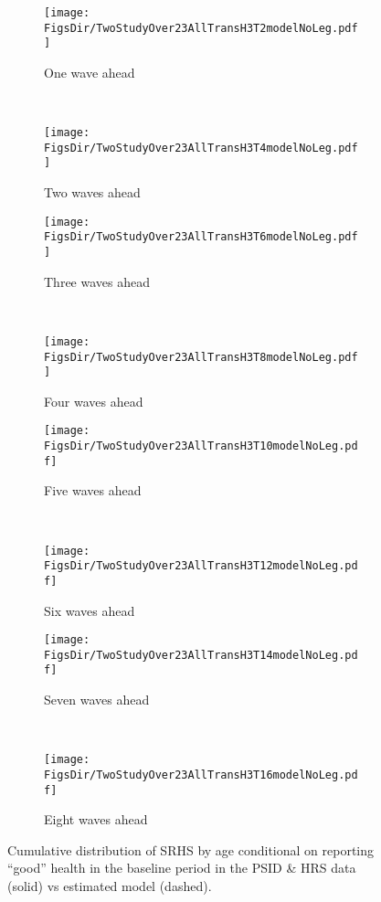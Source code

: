 \documentclass[12pt,pdftex,letterpaper]{article}
\newcommand{\RootDir}{..}
\newcommand{\FigsDir}{\RootDir/Figures}
\begin{document}
\begin{figure}
	\centering
	\begin{subfigure}[b]{0.45\textwidth}
		\texttt{[image: \\FigsDir/TwoStudyOver23AllTransH3T2modelNoLeg.pdf]}
		\caption{One wave ahead}\label{fig:Model1AheadGood}
	\end{subfigure}
	~
	\begin{subfigure}[b]{0.45\textwidth}
		\texttt{[image: \\FigsDir/TwoStudyOver23AllTransH3T4modelNoLeg.pdf]}
		\caption{Two waves ahead}\label{fig:Model2AheadGood}
	\end{subfigure}
	
	\begin{subfigure}[b]{0.45\textwidth}
		\texttt{[image: \\FigsDir/TwoStudyOver23AllTransH3T6modelNoLeg.pdf]}
		\caption{Three waves ahead}\label{fig:Model3AheadGood}
	\end{subfigure}
	~
	\begin{subfigure}[b]{0.45\textwidth}
		\texttt{[image: \\FigsDir/TwoStudyOver23AllTransH3T8modelNoLeg.pdf]}
		\caption{Four waves ahead}\label{fig:Model4AheadGood}
	\end{subfigure}
	
	\begin{subfigure}[b]{0.45\textwidth}
		\texttt{[image: \\FigsDir/TwoStudyOver23AllTransH3T10modelNoLeg.pdf]}
		\caption{Five waves ahead}\label{fig:Model5AheadGood}
	\end{subfigure}
	~
	\begin{subfigure}[b]{0.45\textwidth}
		\texttt{[image: \\FigsDir/TwoStudyOver23AllTransH3T12modelNoLeg.pdf]}
		\caption{Six waves ahead}\label{fig:Model6AheadGood}
	\end{subfigure}
	
	\begin{subfigure}[b]{0.45\textwidth}
		\texttt{[image: \\FigsDir/TwoStudyOver23AllTransH3T14modelNoLeg.pdf]}
		\caption{Seven waves ahead}\label{fig:Model7AheadGood}
	\end{subfigure}
	~
	\begin{subfigure}[b]{0.45\textwidth}
		\texttt{[image: \\FigsDir/TwoStudyOver23AllTransH3T16modelNoLeg.pdf]}
		\caption{Eight waves ahead}\label{fig:Model8AheadGood}
	\end{subfigure}
	\caption{Cumulative distribution of SRHS by age conditional on reporting ``good'' health in the baseline period in the PSID \& HRS data (solid) vs estimated model (dashed).}\label{fig:ModelTransGD}
\end{figure}
\end{document}
